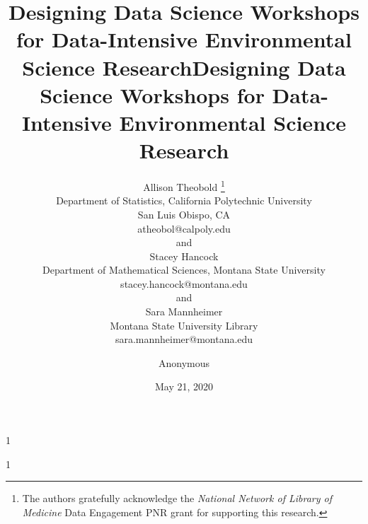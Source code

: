 \documentclass[12pt]{article}
\date{May 21, 2020}
\newcommand{\blind}{1}
\begin{document}
\def\spacingset#1{\renewcommand{\baselinestretch}%
{#1}\small\normalsize} \spacingset{1}



\blind
{
  \title{\bf Designing Data Science Workshops for Data-Intensive Environmental 
  Science Research}
  \author{Allison Theobold \thanks{The authors gratefully acknowledge the 
  \textit{National Network of Library of Medicine}
    Data Engagement PNR grant for supporting this research.} \hspace{.2cm}\\
    Department of Statistics, California Polytechnic University \\
    San Luis Obispo, CA \\
    atheobol@calpoly.edu \\
    and \\
    Stacey Hancock \\
    Department of Mathematical Sciences, Montana State University \\
    stacey.hancock@montana.edu \\
    and \\
    Sara Mannheimer \\
    Montana State University Library \\
    sara.mannheimer@montana.edu
    }
  \maketitle 
} \fi

\blind
{
  \title{\bf Designing Data Science Workshops for Data-Intensive Environmental
  Science Research}
  \author{Anonymous}
  \date{}
  \maketitle
} \fi

\bigskip
\end{document}
